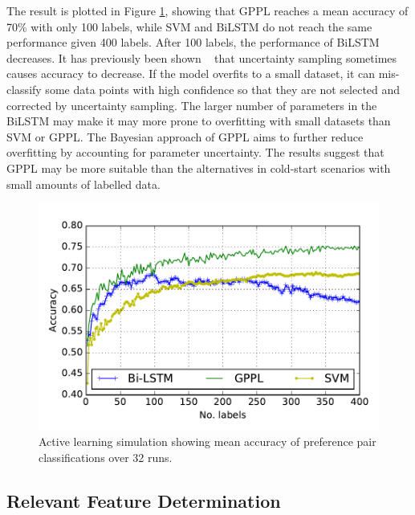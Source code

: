 The result is plotted in Figure \ref{fig:active_learning}, showing that GPPL
reaches a mean accuracy of 70\% with only 100 labels, while SVM and BiLSTM do not reach the same performance given 400 labels. 
After 100 labels, the 
performance of BiLSTM decreases. It has previously been shown ~\cite{cawley2011baseline,guyon2011results,settles2010active} that uncertainty sampling sometimes causes accuracy to decrease. If the model overfits to a small dataset, 
it can mis-classify some data points with high confidence so that they are not selected and corrected by uncertainty sampling.  
The larger number of parameters in the BiLSTM may make it may more prone to overfitting with small datasets than SVM or GPPL. 
The Bayesian approach of GPPL aims to further 
reduce overfitting by accounting for parameter uncertainty.
The results suggest that GPPL may be more suitable than the alternatives in cold-start scenarios with small amounts of labelled data. 
\begin{figure}
\centering
\includegraphics[width=0.9\columnwidth,trim=14 17 10 22,clip=true]{figures/active_learning_2/test_acc}
\caption{Active learning simulation showing mean accuracy of preference pair classifications over 32 runs.}
\label{fig:active_learning}
\end{figure}

\subsection{Relevant Feature Determination}

